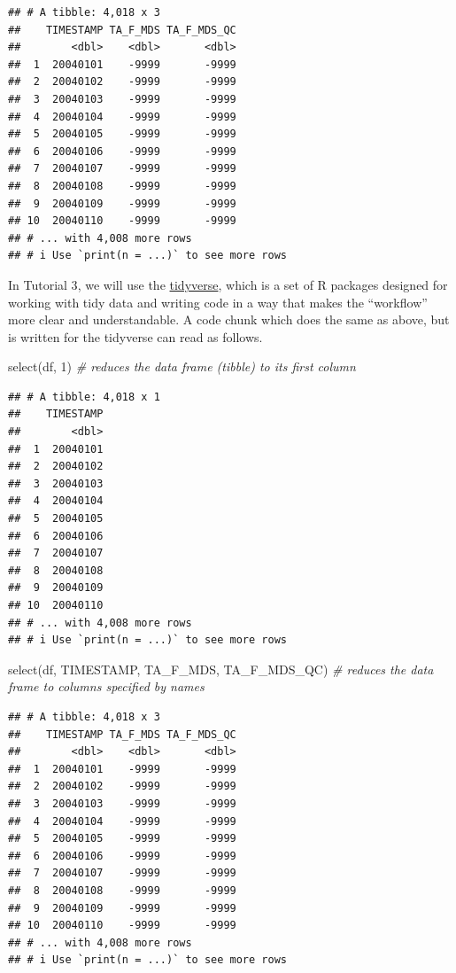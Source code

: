 \documentclass[
]{book}
\newenvironment{Shaded}{\begin{snugshade}}{\end{snugshade}}
\newcommand{\CommentTok}[1]{\textcolor[rgb]{0.56,0.35,0.01}{\textit{#1}}}
\newcommand{\DecValTok}[1]{\textcolor[rgb]{0.00,0.00,0.81}{#1}}
\newcommand{\FunctionTok}[1]{\textcolor[rgb]{0.00,0.00,0.00}{#1}}
\newcommand{\NormalTok}[1]{#1}
\begin{document}
\begin{verbatim}
## # A tibble: 4,018 x 3
##    TIMESTAMP TA_F_MDS TA_F_MDS_QC
##        <dbl>    <dbl>       <dbl>
##  1  20040101    -9999       -9999
##  2  20040102    -9999       -9999
##  3  20040103    -9999       -9999
##  4  20040104    -9999       -9999
##  5  20040105    -9999       -9999
##  6  20040106    -9999       -9999
##  7  20040107    -9999       -9999
##  8  20040108    -9999       -9999
##  9  20040109    -9999       -9999
## 10  20040110    -9999       -9999
## # ... with 4,008 more rows
## # i Use `print(n = ...)` to see more rows
\end{verbatim}

In \protect\hypertarget{data_wrangling}{}{Tutorial 3}, we will use the \href{https://www.tidyverse.org/}{tidyverse}, which is a set of R packages designed for working with tidy data and writing code in a way that makes the ``workflow'' more clear and understandable. A code chunk which does the same as above, but is written for the tidyverse can read as follows.

\begin{Shaded}
\begin{Highlighting}[]
\FunctionTok{select}\NormalTok{(df, }\DecValTok{1}\NormalTok{) }\CommentTok{\# reduces the data frame (tibble) to its first column}
\end{Highlighting}
\end{Shaded}

\begin{verbatim}
## # A tibble: 4,018 x 1
##    TIMESTAMP
##        <dbl>
##  1  20040101
##  2  20040102
##  3  20040103
##  4  20040104
##  5  20040105
##  6  20040106
##  7  20040107
##  8  20040108
##  9  20040109
## 10  20040110
## # ... with 4,008 more rows
## # i Use `print(n = ...)` to see more rows
\end{verbatim}

\begin{Shaded}
\begin{Highlighting}[]
\FunctionTok{select}\NormalTok{(df, TIMESTAMP, TA\_F\_MDS, TA\_F\_MDS\_QC)  }\CommentTok{\# reduces the data frame to columns specified by names}
\end{Highlighting}
\end{Shaded}

\begin{verbatim}
## # A tibble: 4,018 x 3
##    TIMESTAMP TA_F_MDS TA_F_MDS_QC
##        <dbl>    <dbl>       <dbl>
##  1  20040101    -9999       -9999
##  2  20040102    -9999       -9999
##  3  20040103    -9999       -9999
##  4  20040104    -9999       -9999
##  5  20040105    -9999       -9999
##  6  20040106    -9999       -9999
##  7  20040107    -9999       -9999
##  8  20040108    -9999       -9999
##  9  20040109    -9999       -9999
## 10  20040110    -9999       -9999
## # ... with 4,008 more rows
## # i Use `print(n = ...)` to see more rows
\end{verbatim}
\end{document}
